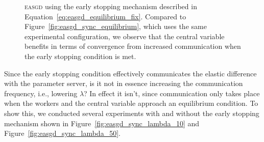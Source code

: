 \begin{figure}[H]
\begin{subfigure}{.45\textwidth}
  \end{subfigure}
  \caption{\textsc{easgd} using the early stopping mechanism described in Equation~\ref{eq:easgd_equilibrium_fix}. Compared to Figure~\ref{fig:easgd_sync_equilibrium}, which uses the same experimental configuration, we observe that the central variable benefits in terms of convergence from increased communication when the early stopping condition is met.}
  \label{fig:easgd_sync_fix}
\end{figure}

Since the early stopping condition effectively communicates the elastic difference with the parameter server, is it not in essence increasing the communication frequency, i.e., lowering $\lambda$? In effect it isn't, since communication only takes place when the workers and the central variable approach an equilibrium condition. To show this, we conducted several experiments with and without the early stopping mechanism shown in Figure~\ref{fig:easgd_sync_lambda_10} and Figure~\ref{fig:easgd_sync_lambda_50}.

